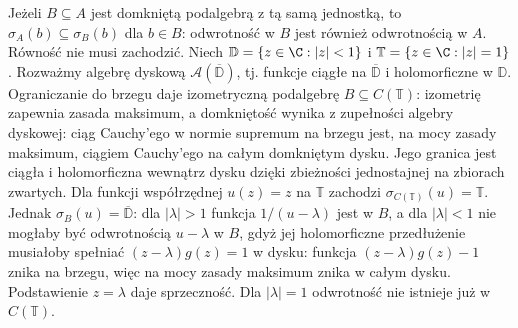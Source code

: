 \begin{uwaga}
Jeżeli $B\subseteq A$ jest domkniętą podalgebrą z tą samą jednostką,
to $\sigma_A(b)\subseteq\sigma_B(b)$ dla $b\in B$:
odwrotność w $B$ jest również odwrotnością w $A$.
Równość nie musi zachodzić. Niech
$\mathbb D=\{z\in\C:|z|<1\}$ i
$\mathbb T=\{z\in\C:|z|=1\}$.
Rozważmy algebrę dyskową
$\mathcal A(\overline{\mathbb D})$, tj. funkcje ciągłe
na $\overline{\mathbb D}$ i holomorficzne w $\mathbb D$.
Ograniczanie do brzegu daje izometryczną podalgebrę
$B\subseteq C(\mathbb T)$: izometrię zapewnia zasada maksimum,
a domkniętość wynika z zupełności algebry dyskowej:
ciąg Cauchy'ego w normie supremum na brzegu jest, na mocy
zasady maksimum, ciągiem Cauchy'ego na całym domkniętym
dysku. Jego granica jest ciągła i holomorficzna wewnątrz
dysku dzięki zbieżności jednostajnej na zbiorach zwartych.
Dla funkcji współrzędnej $u(z)=z$ na $\mathbb T$ zachodzi
$\sigma_{C(\mathbb T)}(u)=\mathbb T$.
Jednak $\sigma_B(u)=\overline{\mathbb D}$: dla
$|\lambda|>1$ funkcja $1/(u-\lambda)$ jest w $B$,
a dla $|\lambda|<1$ nie mogłaby być odwrotnością
$u-\lambda$ w $B$, gdyż jej holomorficzne przedłużenie
musiałoby spełniać $(z-\lambda)g(z)=1$ w dysku:
funkcja $(z-\lambda)g(z)-1$ znika na brzegu, więc
na mocy zasady maksimum znika w całym dysku.
Podstawienie $z=\lambda$ daje sprzeczność.
Dla $|\lambda|=1$ odwrotność nie istnieje już w
$C(\mathbb T)$.
\end{uwaga}

